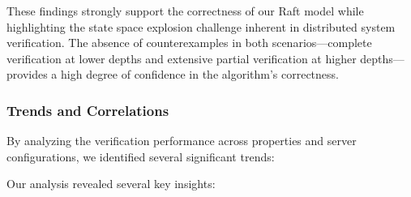 These findings strongly support the correctness of our Raft model while highlighting the state space explosion challenge inherent in distributed system verification. The absence of counterexamples in both scenarios—complete verification at lower depths and extensive partial verification at higher depths—provides a high degree of confidence in the algorithm's correctness.

\subsubsection{Trends and Correlations}
\label{sec:trends}

By analyzing the verification performance across properties and server configurations, we identified several significant trends:

\begin{table}[!htbp]
\centering
\caption{Performance Trend Analysis by Property Type}
\label{tab:performance-trends}
\end{table}

Our analysis revealed several key insights:

